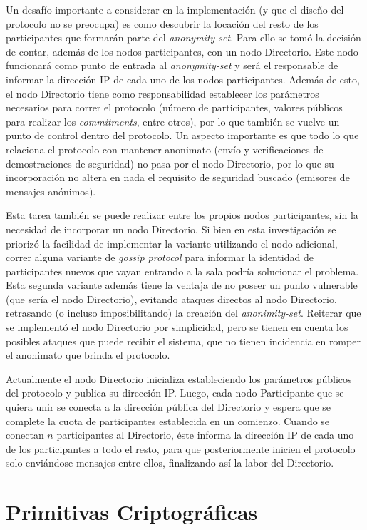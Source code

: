 Un desafío importante a considerar en la implementación (y que el diseño del protocolo no se preocupa) es como descubrir la locación del resto de los participantes que formarán parte del \emph{anonymity-set}. Para ello se tomó la decisión de contar, además de los nodos participantes, con un nodo Directorio. Este nodo funcionará como punto de entrada al \emph{anonymity-set} y será el responsable de informar la dirección IP de cada uno de los nodos participantes. Además de esto, el nodo Directorio tiene como responsabilidad establecer los parámetros necesarios para correr el protocolo (número de participantes, valores públicos para realizar los \emph{commitments}, entre otros), por lo que también se vuelve un punto de control dentro del protocolo. Un aspecto importante es que todo lo que relaciona el protocolo con mantener anonimato (envío y verificaciones de demostraciones de seguridad) no pasa por el nodo Directorio, por lo que su incorporación no altera en nada el requisito de seguridad buscado (emisores de mensajes anónimos).

Esta tarea también se puede realizar entre los propios nodos participantes, sin la necesidad de incorporar un nodo Directorio. Si bien en esta investigación se priorizó la facilidad de implementar la variante utilizando el nodo adicional, correr alguna variante de \emph{gossip protocol} para informar la identidad de participantes nuevos que vayan entrando a la sala podría solucionar el problema. Esta segunda variante además tiene la ventaja de no poseer un punto vulnerable (que sería el nodo Directorio), evitando ataques directos al nodo Directorio, retrasando (o incluso imposibilitando) la creación del \emph{anonimity-set}. Reiterar que se implementó el nodo Directorio por simplicidad, pero se tienen en cuenta los posibles ataques que puede recibir el sistema, que no tienen incidencia en romper el anonimato que brinda el protocolo.

Actualmente el nodo Directorio inicializa estableciendo los parámetros públicos del protocolo y publica su dirección IP. Luego, cada nodo Participante que se quiera unir se conecta a la dirección pública del Directorio y espera que se complete la cuota de participantes establecida en un comienzo. Cuando se conectan $n$ participantes al Directorio, éste informa la dirección IP de cada uno de los participantes a todo el resto, para que posteriormente inicien el protocolo solo enviándose mensajes entre ellos, finalizando así la labor del Directorio.

\section{Primitivas Criptográficas}


